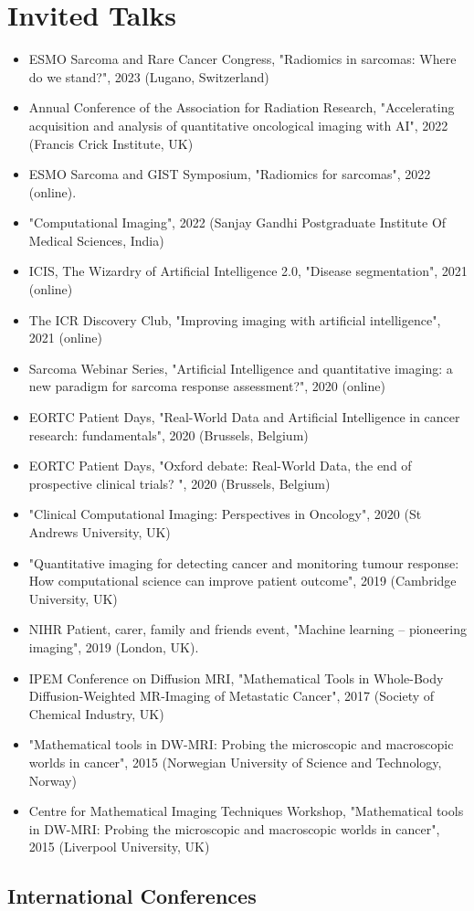 \documentclass[]{mbcv}
\begin{document}
\section{Invited Talks}
\begin{itemize}
\item ESMO Sarcoma and Rare Cancer Congress, "Radiomics in sarcomas: Where do we stand?", 2023 (Lugano, Switzerland)
\item Annual Conference of the Association for Radiation Research, "Accelerating acquisition and analysis of quantitative oncological imaging with AI", 2022 (Francis Crick Institute, UK)
\item ESMO Sarcoma and GIST Symposium, "Radiomics for sarcomas", 2022 (online).
\item "Computational Imaging", 2022 (Sanjay Gandhi Postgraduate Institute Of Medical Sciences, India)
\item ICIS, The Wizardry of Artificial Intelligence 2.0, "Disease segmentation", 2021 (online)
\item The ICR Discovery Club, "Improving imaging with artificial intelligence", 2021 (online)
\item Sarcoma Webinar Series, "Artificial Intelligence and quantitative imaging: a new paradigm for sarcoma response assessment?", 2020 (online)
\item EORTC Patient Days, "Real-World Data and Artificial Intelligence in cancer research: fundamentals", 2020 (Brussels, Belgium)
\item EORTC Patient Days, "Oxford debate: Real-World Data, the end of prospective clinical
trials? ", 2020 (Brussels, Belgium)
\item "Clinical Computational Imaging: Perspectives in Oncology", 2020 (St Andrews University, UK)
\item "Quantitative imaging for detecting cancer and monitoring tumour response: How computational science can improve patient outcome", 2019 (Cambridge University, UK)
\item NIHR Patient, carer, family and friends event, "Machine learning – pioneering imaging", 2019 (London, UK).
\item IPEM Conference on Diffusion MRI, "Mathematical Tools in Whole-Body Diffusion-Weighted MR-Imaging of Metastatic Cancer", 2017 (Society of Chemical Industry, UK)
\item "Mathematical tools in DW-MRI: Probing the microscopic and macroscopic worlds in cancer", 2015 (Norwegian University of Science and Technology, Norway)
\item Centre for Mathematical Imaging Techniques Workshop, "Mathematical tools in DW-MRI: Probing the microscopic and macroscopic worlds in cancer", 2015 (Liverpool University, UK)
\end{itemize}

\begin{refsection}
\nocite{*}
\section{International Conferences}
\vspace*{10pt}
\printbibliography[heading=none]
\end{refsection}

\clearpage
\restoregeometry
\end{document}

